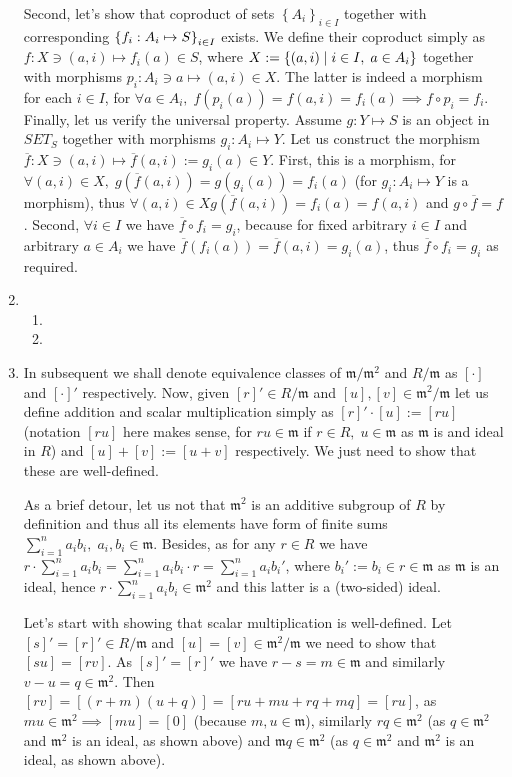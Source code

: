 \documentclass[8pt]{article} %
\begin{document}
\begin{enumerate}[label=\bfseries Problem \arabic*.]
{		Second, let's show that coproduct of sets $\left\{A_i\right\}_{i\in I}$ 
		together with corresponding $\left\{f_i:A_i\mapsto S\right\}_{i\in I}$ exists. We define their coproduct simply as
		$f:X\ni(a,i)\mapsto f_i(a)\in S$, where $X:=\left\{(a,i)\mid i\in I,\;a\in A_i\right\}$ together with morphisms 
		$p_i:A_i\ni a\mapsto (a,i)\in X$. The latter is indeed a morphism for each $i\in I$, for $\forall a\in A_i,\;
		f(p_i(a))=f(a,i)=f_i(a)\implies f\circ p_i=f_i$. Finally, let us verify the universal property. Assume
		$g:Y\mapsto S$ is an object in $SET_S$ together with morphisms $g_i:A_i\mapsto Y$. Let us construct the morphism
		$\overline{f}:X\ni (a,i)\mapsto \overline{f}(a,i):=g_i(a)\in Y$. First, this is a morphism, for $\forall (a,i)\in X,\;
		g(\overline{f}(a,i))=g(g_i(a))=f_i(a)$ (for $g_i:A_i\mapsto Y$ is a morphism), thus $\forall (a,i)\in X
		g(\overline{f}(a,i))=f_i(a)=f(a,i)$ and $g\circ\overline{f}=f$. Second, $\forall i\in I$ we have $\overline{f}\circ
		f_i=g_i$, because for fixed arbitrary $i\in I$ and arbitrary $a\in A_i$ we have $\overline{f}(f_i(a))=\overline{f}(a,i
		)=g_i(a)$, thus $\overline{f}\circ f_i=g_i$ as required.
		}
	\item{\begin{enumerate}[label=(\arabic*).]
			\item{}
			\item{}
		\end{enumerate}
		}
	\item{\newcommand{\m}{\mathfrak{m}}
		In subsequent we shall denote equivalence classes of $\mathfrak{m}/\mathfrak{m}^2$ and $R/\mathfrak{m}$ as $[\cdot]$ and
		$[\cdot]'$ respectively. Now, given $[r]'\in R/\m$ and $[u],[v]\in \m^2/\m$ let us define addition and scalar multiplication
		simply as $[r]'\cdot[u]:=[ru]$ (notation $[ru]$ here makes sense, for $ru\in\m$ if $r\in R,\;u\in\m$ as $\m$ is and 
		ideal in $R$)
		and $[u]+[v]:=[u+v]$ respectively. We just need to show that these are well-defined.

		As a brief detour, let us not that $\m^2$ is an additive subgroup of $R$ by definition and thus all its elements
		have form of finite sums $\sum_{i=1}^n a_ib_i,\;a_i,b_i\in\m$. Besides, as for any $r\in R$ we have $r\cdot
		\sum_{i=1}^n a_ib_i=\sum_{i=1}^n a_ib_i\cdot r=\sum_{i=1}^n a_ib_i'$, where $b_i':=b_i\in r\in\m$ as $\m$ is
		an ideal, hence $r\cdot\sum_{i=1}^n a_ib_i\in\m^2$ and this latter is a (two-sided) ideal.

		Let's start with showing that scalar multiplication is well-defined.
		Let $[s]'=[r]'\in R/\m$ and $[u]=[v]\in \m^2/\m$ we need to show that
		$[su]=[rv]$. As $[s]'=[r]'$ we have $r-s=m\in\m$ and similarly $v-u=q\in\m^2$. Then $[rv]=[(r+m)(u+q)]=
		[ru+mu+rq+mq]=[ru]$, as $mu\in\m^2\implies[mu]=[0]$ (because $m,u\in\m$), similarly $rq\in\m^2$ (as $q\in \m^2$ and
		$\m^2$ is an ideal, as shown above) and $\m q\in\m^2$ (as $q\in \m^2$ and $\m^2$ is an ideal, as shown above).

}
\end{enumerate}
\end{document}
